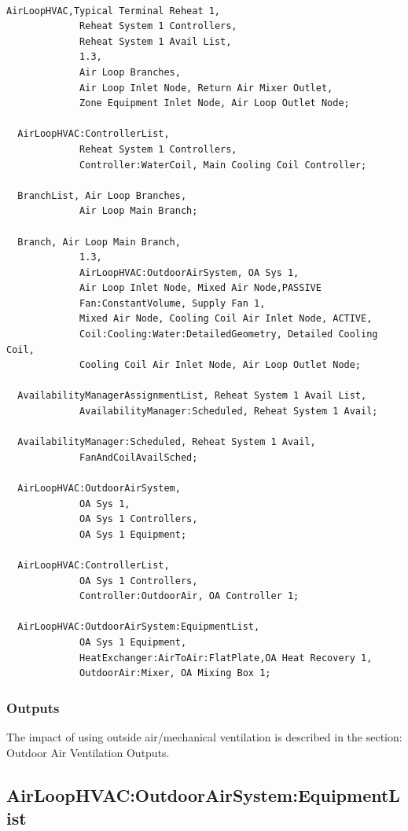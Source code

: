 \begin{lstlisting}

AirLoopHVAC,Typical Terminal Reheat 1,
             Reheat System 1 Controllers,
             Reheat System 1 Avail List,
             1.3,
             Air Loop Branches,
             Air Loop Inlet Node, Return Air Mixer Outlet,
             Zone Equipment Inlet Node, Air Loop Outlet Node;

  AirLoopHVAC:ControllerList,
             Reheat System 1 Controllers,
             Controller:WaterCoil, Main Cooling Coil Controller;

  BranchList, Air Loop Branches,
             Air Loop Main Branch;

  Branch, Air Loop Main Branch,
             1.3,
             AirLoopHVAC:OutdoorAirSystem, OA Sys 1,
             Air Loop Inlet Node, Mixed Air Node,PASSIVE
             Fan:ConstantVolume, Supply Fan 1,
             Mixed Air Node, Cooling Coil Air Inlet Node, ACTIVE,
             Coil:Cooling:Water:DetailedGeometry, Detailed Cooling Coil,
             Cooling Coil Air Inlet Node, Air Loop Outlet Node;

  AvailabilityManagerAssignmentList, Reheat System 1 Avail List,
             AvailabilityManager:Scheduled, Reheat System 1 Avail;

  AvailabilityManager:Scheduled, Reheat System 1 Avail,
             FanAndCoilAvailSched;

  AirLoopHVAC:OutdoorAirSystem,
             OA Sys 1,
             OA Sys 1 Controllers,
             OA Sys 1 Equipment;

  AirLoopHVAC:ControllerList,
             OA Sys 1 Controllers,
             Controller:OutdoorAir, OA Controller 1;

  AirLoopHVAC:OutdoorAirSystem:EquipmentList,
             OA Sys 1 Equipment,
             HeatExchanger:AirToAir:FlatPlate,OA Heat Recovery 1,
             OutdoorAir:Mixer, OA Mixing Box 1;
\end{lstlisting}

\subsubsection{Outputs}\label{outputs-2-001}

The impact of using outside air/mechanical ventilation is described in the section: Outdoor Air Ventilation Outputs.

\subsection{AirLoopHVAC:OutdoorAirSystem:EquipmentList}\label{airloophvacoutdoorairsystemequipmentlist}


